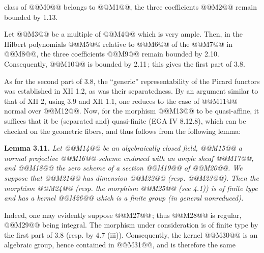 class of @@M0@@ belongs to @@M1@@, the three coefficients @@M2@@ remain bounded by 1.13.

Let @@M3@@ be a multiple of @@M4@@ which is very ample. Then, in the Hilbert polynomials @@M5@@ relative to @@M6@@ of the @@M7@@ in @@M8@@, the three coefficients @@M9@@ remain bounded by 2.10. Consequently, @@M10@@ is bounded by 2.11\,; this gives the first part of 3.8.

As for the second part of 3.8, the ``generic'' representability of the Picard functors was established in XII 1.2, as was their separatedness. By an argument similar to that of XII 2, using 3.9 and XII 1.1, one reduces to the case of @@M11@@ normal over @@M12@@. Now, for the morphism @@M13@@ to be quasi-affine, it suffices that it be (separated and) quasi-finite (EGA IV 8.12.8), which can be checked on the geometric fibers, and thus follows from the following lemma:

\textbf{Lemma 3.11.} \emph{Let @@M14@@ be an algebraically closed field, @@M15@@ a normal projective @@M16@@-scheme endowed with an ample sheaf @@M17@@, and @@M18@@ the zero scheme of a section @@M19@@ of @@M20@@. We suppose that @@M21@@ has dimension @@M22@@ (resp. @@M23@@). Then the morphism @@M24@@ (resp. the morphism @@M25@@ (see 4.1)) is of finite type and has a kernel @@M26@@ which is a finite group (in general nonreduced).}

Indeed, one may evidently suppose @@M27@@\,; thus @@M28@@ is regular, @@M29@@ being integral. The morphism under consideration is of finite type by the first part of 3.8 (resp. by 4.7 (iii)). Consequently, the kernel @@M30@@ is an algebraic group, hence contained in @@M31@@, and is therefore the same
